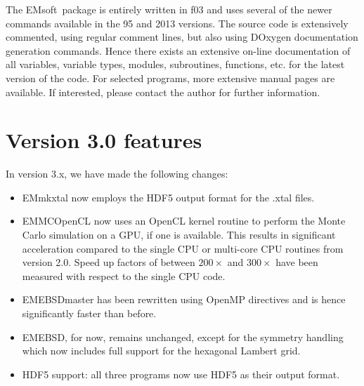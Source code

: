 \documentclass[DIV=calc, paper=letter, fontsize=11pt]{scrartcl}	 %
\newcommand{\ctp}{\textsf{EMsoft}}
\begin{document}
The \ctp\ package is entirely written in f03 and uses several of the newer commands available in the 95 and 2013 versions.
The source code is extensively commented, using regular comment lines, but also using DOxygen documentation generation commands.  Hence
there exists an extensive on-line documentation of all variables, variable types, modules, subroutines, functions, etc. for the latest version 
of the code.  For selected programs, more extensive manual pages are available.  If interested, please contact the author for further information.

%

\newpage
\section{Version 3.0 features}
In version 3.x, we have made the following changes:
\begin{itemize}
	\item \textsf{EMmkxtal} now employs the HDF5 output format for the .xtal files.
	\item \textsf{EMMCOpenCL} now uses an OpenCL kernel routine to perform the Monte Carlo simulation on a GPU, if one is available.  This results in significant acceleration compared to the single CPU or multi-core CPU routines from version 2.0.  Speed up factors of between $200\times$ and $300\times$ have been measured with respect to the single CPU code.
	\item \textsf{EMEBSDmaster} has been rewritten using OpenMP directives and is hence significantly faster than before.
	\item \textsf{EMEBSD}, for now, remains unchanged, except for the symmetry handling which now includes full support for the hexagonal Lambert grid.
	\item HDF5 support: all three programs now use HDF5 as their output format.
\end{itemize}
\end{document}
